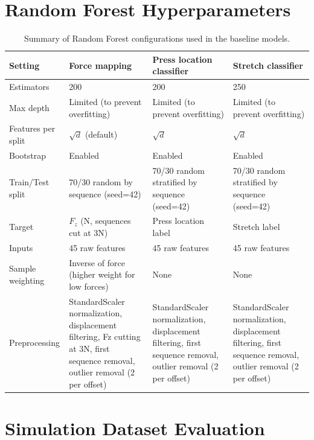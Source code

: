 \documentclass[11pt,a4paper]{article}
\begin{document}
\section{Random Forest Hyperparameters}
\label{sec:appendix-hyperparams}
\begin{table}[H]
    \centering
    \caption{Summary of Random Forest configurations used in the baseline models.}
    \begin{tabular}{@{}p{4.2cm}p{3.2cm}p{3.2cm}p{3.2cm}@{}}
        \toprule
        Setting & Force mapping & Press location classifier & Stretch classifier \\
        \midrule
        Estimators & 200 & 200 & 250 \\
        Max depth & Limited (to prevent overfitting) & Limited (to prevent overfitting) & Limited (to prevent overfitting) \\
        Features per split & $\sqrt{d}$ (default) & $\sqrt{d}$ & $\sqrt{d}$ \\
        Bootstrap & Enabled & Enabled & Enabled \\
        Train/Test split & 70/30 random by sequence (seed=42) & 70/30 random stratified by sequence (seed=42) & 70/30 random stratified by sequence (seed=42) \\
        Target & $F_z$ (N, sequences cut at 3N) & Press location label & Stretch label \\
        Inputs & 45 raw features & 45 raw features & 45 raw features \\
        Sample weighting & Inverse of force (higher weight for low forces) & None & None \\
        Preprocessing & StandardScaler normalization, displacement filtering, Fz cutting at 3N, first sequence removal, outlier removal (2 per offset) & StandardScaler normalization, displacement filtering, first sequence removal, outlier removal (2 per offset) & StandardScaler normalization, displacement filtering, first sequence removal, outlier removal (2 per offset) \\
        \bottomrule
    \end{tabular}
    \label{tab:rf-params}
\end{table}


\section{Simulation Dataset Evaluation}
\label{sec:simulation}
\end{document}
